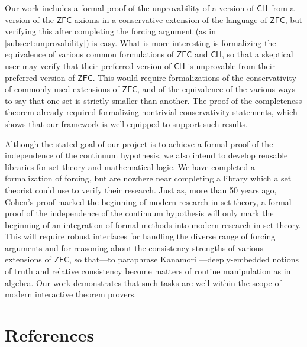 \documentclass[a4paper,USenglish,cleveref, autoref]{lipics-v2019}
\theoremstyle{theorem}
\theoremstyle{definition}
\begin{document}
Our work includes a formal proof of the unprovability of a version of $\mathsf{CH}$ from a version of the $\mathsf{ZFC}$ axioms in a conservative extension of the language of $\mathsf{ZFC}$, but verifying this after completing the forcing argument (as in \autoref{subsect:unprovability}) is easy. What is more interesting is formalizing the equivalence of various common formulations of $\mathsf{ZFC}$ and $\mathsf{CH}$, so that a skeptical user may verify that their preferred version of $\mathsf{CH}$ is unprovable from their preferred version of $\mathsf{ZFC}$. This would require formalizations of the conservativity of commonly-used extensions of $\mathsf{ZFC}$, and of the equivalence of the various ways to say that one set is strictly smaller than another. %
The proof of the completeness theorem already required formalizing nontrivial conservativity statements, which shows that our framework is well-equipped to support such results.

Although the stated goal of our project is to achieve a formal proof of the independence of the continuum hypothesis, we also intend to develop reusable libraries for set theory and mathematical logic. We have completed a formalization of forcing, but are nowhere near completing a library which a set theorist could use to verify their research. Just as, more than 50 years ago, Cohen's proof marked the beginning of modern research in set theory, a formal proof of the independence of the continuum hypothesis will only mark the beginning of an integration of formal methods into modern research in set theory. This will require robust interfaces for handling the diverse range of forcing arguments and for reasoning about the consistency strengths of various extensions of $\mathsf{ZFC}$, so that---to paraphrase Kanamori \cite{kanamori1996mathematical, kanamori2008higher}---deeply-embedded notions of truth and relative consistency become matters of routine manipulation as in algebra. Our work demonstrates that such tasks are well within the scope of modern interactive theorem provers.

\section{References}


\end{document}
